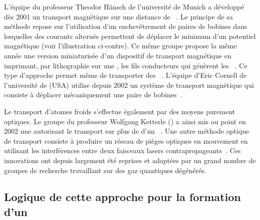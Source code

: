L'équipe du professeur Theodor Hänsch de l'université de Munich a développé dès 2001 un transport magnétique sur une distance de ~\cite{GBH01}. Le principe de sa méthode repose sur l'utilisation d'un enchevêtrement de paires de bobines dans lesquelles des courants alternés permettent de déplacer le minimum d'un potentiel magnétique (voir l'illustration ci-contre). 
\noindent Ce même groupe propose la même année une version miniaturisée d'un dispositif de transport magnétique en imprimant, par lithographie sur une , les fils conducteurs qui génèrent les \chms~\cite{HRH01}. Ce type d'approche permet même de transporter des \bec~\cite{HHS05}. 
L'équipe d'Eric Cornell de l'université de  (USA) utilise depuis 2002 un système de transport magnétique qui consiste à déplacer mécaniquement une paire de bobines~\cite{LHW03, NSH05}. 

Le transport d'atomes froids s'effectue également par des moyens purement optiques. Le groupe du professeur Wolfgang Ketterle () a ainsi mis au point en 2002 une  autorisant le transport sur plus de  d'un \bec~\cite{GCL02}. Une autre méthode optique de transport consiste à produire un réseau de pièges optiques en mouvement en utilisant les interférences entre deux faisceaux lasers contrapropageants~\cite{STW06,MGW03}.
Ces innovations ont depuis largement été reprises et adaptées par un grand nombre de groupes de recherche travaillant sur des gaz quantiques dégénérés. 


\subsection{Logique de cette approche pour la formation d'un \jatuf}

